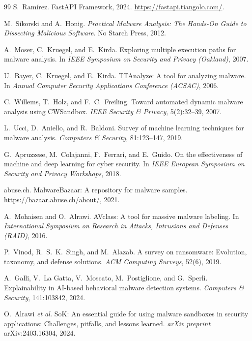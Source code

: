 \begin{thebibliography}{99}
S.~Ramírez.
\newblock FastAPI Framework, 2024.
\newblock \url{https://fastapi.tiangolo.com/}.

M.~Sikorski and A.~Honig.
\newblock \emph{Practical Malware Analysis: The Hands-On Guide to Dissecting Malicious Software}.
\newblock No Starch Press, 2012.

A.~Moser, C.~Kruegel, and E.~Kirda.
\newblock Exploring multiple execution paths for malware analysis.
\newblock In \emph{IEEE Symposium on Security and Privacy (Oakland)}, 2007.

U.~Bayer, C.~Kruegel, and E.~Kirda.
\newblock TTAnalyze: A tool for analyzing malware.
\newblock In \emph{Annual Computer Security Applications Conference (ACSAC)}, 2006.

C.~Willems, T.~Holz, and F.~C.~Freiling.
\newblock Toward automated dynamic malware analysis using CWSandbox.
\newblock \emph{IEEE Security \& Privacy}, 5(2):32--39, 2007.

L.~Ucci, D.~Aniello, and R.~Baldoni.
\newblock Survey of machine learning techniques for malware analysis.
\newblock \emph{Computers \& Security}, 81:123--147, 2019.

G.~Apruzzese, M.~Colajanni, F.~Ferrari, and E.~Guido.
\newblock On the effectiveness of machine and deep learning for cyber security.
\newblock In \emph{IEEE European Symposium on Security and Privacy Workshops}, 2018.

abuse.ch.
\newblock MalwareBazaar: A repository for malware samples.
\newblock \url{https://bazaar.abuse.ch/about/}, 2021.

A.~Mohaisen and O.~Alrawi.
\newblock AVclass: A tool for massive malware labeling.
\newblock In \emph{International Symposium on Research in Attacks, Intrusions and Defenses (RAID)}, 2016.

P.~Vinod, R.~S.~K.~Singh, and M.~Alazab.
\newblock A survey on ransomware: Evolution, taxonomy, and defense solutions.
\newblock \emph{ACM Computing Surveys}, 52(6), 2019.

A.~Galli, V.~La Gatta, V.~Moscato, M.~Postiglione, and G.~Sperl{\`i}.
\newblock Explainability in AI-based behavioral malware detection systems.
\newblock \emph{Computers \& Security}, 141:103842, 2024.

O.~Alrawi \emph{et al.}
\newblock SoK: An essential guide for using malware sandboxes in security applications: Challenges, pitfalls, and lessons learned.
\newblock \emph{arXiv preprint} arXiv:2403.16304, 2024.


\end{thebibliography}
